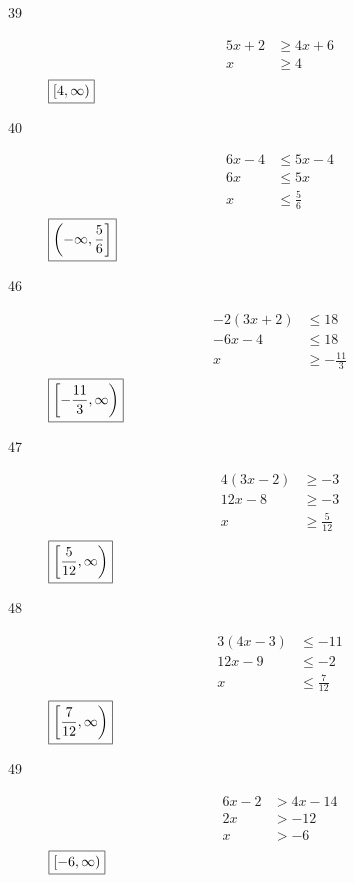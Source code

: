 \documentclass[letterpaper]{exam}
\begin{document}
\begin{description}
      \item[39]
        \begin{align*}
          5x + 2 & \geq 4x + 6 \\
          x      & \geq 4 \\
        \end{align*}
        $\boxed{ \intco{ 4, \infty } }$

      \item[40]
        \begin{align*}
          6x - 4 & \leq 5x - 4 \\
          6x & \leq 5x \\
          x      & \leq \frac{5}{6} \\
        \end{align*}
        $\boxed{ \intoc{ -\infty, \frac{5}{6} } }$

      \item[46]
        \begin{align*}
          -2(3x + 2) & \leq 18 \\
          -6x - 4    & \leq 18 \\
          x          & \geq - \frac{11}{3} \\
        \end{align*}
        $\boxed{ \intco{ -\frac{11}{3}, \infty } }$

      \item[47]
        \begin{align*}
          4 (3x - 2) & \geq -3 \\
          12x - 8    & \geq -3 \\
          x          & \geq \frac{5}{12} \\
        \end{align*}
        $\boxed{ \intco{ \frac{5}{12}, \infty } }$

      \item[48]
        \begin{align*}
          3 (4x - 3) & \leq -11 \\
          12x - 9    & \leq -2 \\
          x          & \leq \frac{7}{12} \\
        \end{align*}
        $\boxed{ \intco{ \frac{7}{12}, \infty } }$

      \item[49]
        \begin{align*}
          6x - 2 & > 4x - 14 \\
          2x     & > -12 \\
          x      & > -6 \\
        \end{align*}
        $\boxed{ \intco{ -6, \infty } }$


\end{description}
\end{document}
